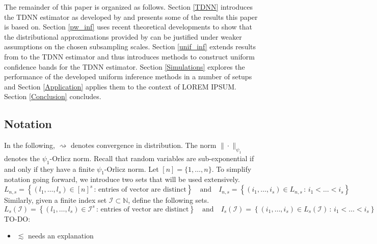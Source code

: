 \documentclass[letterpaper,10pt]{article}
\numberwithin{equation}{section}
\numberwithin{thm}{section}
\numberwithin{lem}{section}
\numberwithin{cor}{section}
\newcommand{\1}{\mathbbm{1}}
\begin{document}
The remainder of this paper is organized as follows.
Section \ref{TDNN} introduces the TDNN estimator as developed by \citet{demirkaya_optimal_2024} and presents some of the results this paper is based on.
Section \ref{pw_inf} uses recent theoretical developments to show that the distributional approximations provided by \citet{demirkaya_optimal_2024} can be justified under weaker assumptions on the chosen subsampling scales.
Section \ref{unif_inf} extends results from \citet{ritzwoller_uniform_2024} to the TDNN estimator and thus introduces methods to construct uniform confidence bands for the TDNN estimator.
Section \ref{Simulations} explores the performance of the developed uniform inference methods in a number of setups and Section \ref{Application} applies them to the context of {\color{red} LOREM IPSUM}.
Section \ref{Conclusion} concludes.

\subsection{Notation}
In the following, $\rightsquigarrow$ denotes convergence in distribution.
The norm $\| \cdot \|_{\psi_1}$ denotes the $\psi_1$-Orlicz norm.
Recall that random variables are sub-exponential if and only if they have a finite $\psi_1$-Orlicz norm.
Let $[n] = \{1, \dotsc, n\}$.
To simplify notation going forward, we introduce two sets that will be used extensively.
\begin{equation}
	L_{n,s} = \left\{\left(l_1, \dotsc, l_s\right) \in [n]^{s} \, : \, \text{entries of vector are distinct} \right\}
	\quad \text{and} \quad
	I_{n,s} = \left\{\left(i_1, \dotsc, i_s\right) \in L_{n,s} \, : \, i_1 < \dotsc < i_s \right\}
\end{equation}
Similarly, given a finite index set $\mathcal{I} \subset \mathbb{N}$, define the following sets.
\begin{equation}
	L_{s}(\mathcal{I}) = \left\{\left(l_1, \dotsc, l_s\right) \in \mathcal{I}^{s} \, : \, \text{entries of vector are distinct} \right\}
	\quad \text{and} \quad
	I_{s}(\mathcal{I}) = \left\{\left(i_1, \dotsc, i_s\right) \in L_{s}(\mathcal{I}) \, : \, i_1 < \dotsc < i_s \right\}
\end{equation}
{\color{red} TO-DO:}
\begin{itemize}
	\item $\lesssim$ needs an explanation
\end{itemize}


\newpage
\end{document}
